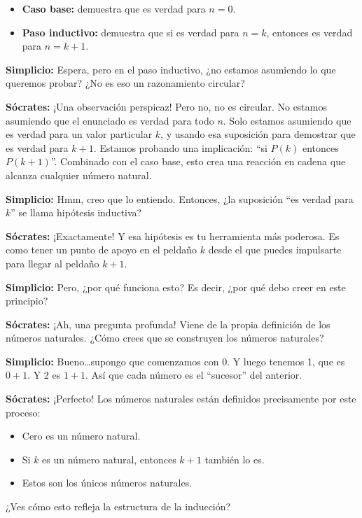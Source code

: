 \begin{itemize}
  \item \textbf{Caso base:} demuestra que es verdad para $n = 0$.
  \item \textbf{Paso inductivo:} demuestra que si es verdad para $n = k$,
        entonces es verdad para $n = k+1$.
\end{itemize}

\textbf{Simplicio:} Espera, pero en el paso inductivo, ¿no estamos
asumiendo lo que queremos probar? ¿No es eso un razonamiento circular?

\textbf{Sócrates:} ¡Una observación perspicaz! Pero no, no es circular.
No estamos asumiendo que el enunciado es verdad para todo $n$. Solo
estamos asumiendo que es verdad para un valor particular $k$, y usando
esa suposición para demostrar que es verdad para $k+1$. Estamos probando
una implicación: ``si $P(k)$ entonces $P(k+1)$''. Combinado con el caso
base, esto crea una reacción en cadena que alcanza cualquier número
natural.

\textbf{Simplicio:} Hmm, creo que lo entiendo. Entonces, ¿la suposición
``es verdad para $k$'' se llama hipótesis inductiva?

\textbf{Sócrates:} ¡Exactamente! Y esa hipótesis es tu herramienta más
poderosa. Es como tener un punto de apoyo en el peldaño $k$ desde el que
puedes impulsarte para llegar al peldaño $k+1$.

\textbf{Simplicio:} Pero, ¿por qué funciona esto? Es decir, ¿por qué
debo creer en este principio?

\textbf{Sócrates:} ¡Ah, una pregunta profunda! Viene de la propia
definición de los números naturales. ¿Cómo crees que se construyen los
números naturales?

\textbf{Simplicio:} Bueno\ldots supongo que comenzamos con 0. Y luego
tenemos 1, que es $0+1$. Y 2 es $1+1$. Así que cada número es el
``sucesor'' del anterior.

\textbf{Sócrates:} ¡Perfecto! Los números naturales están definidos
precisamente por este proceso:

\begin{itemize}
  \item Cero es un número natural.
  \item Si $k$ es un número natural, entonces $k+1$ también lo es.
  \item Estos son los únicos números naturales.
\end{itemize}

¿Ves cómo esto refleja la estructura de la inducción?


